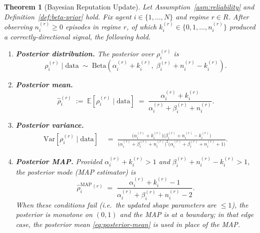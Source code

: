 \documentclass[12pt,openany]{book}
\newcommand{\E}{\mathbb{E}}
\numberwithin{equation}{chapter}
\theoremstyle{plain}
\newtheorem{theorem}{Theorem}[chapter]
\theoremstyle{definition}
\theoremstyle{remark}
\numberwithin{equation}{chapter}
\theoremstyle{plain}
\newcommand{\calR}{\mathcal{R}}
\def\calR{R}%
\begin{document}
\begin{theorem}[Bayesian Reputation Update]
\label{thm:reputation-update}
Let Assumption~\ref{asm:reliability} and
Definition~\ref{def:beta-prior} hold.  Fix agent
$i \in \{1,\ldots,N\}$ and regime $r \in \calR$.
After observing $n_i^{(r)} \geq 0$ episodes in regime $r$,
of which $k_i^{(r)} \in \{0, 1, \ldots, n_i^{(r)}\}$
produced a correctly-directional signal, the following hold.

\begin{enumerate}
  \item[\textup{(i)}] \textbf{Posterior distribution.}
        The posterior over $\rho_i^{(r)}$ is
        \begin{equation}
          \rho_i^{(r)} \mid \mathrm{data}
          \;\sim\;
          \mathrm{Beta}\!\left(
            \alpha_i^{(r)} + k_i^{(r)},\;
            \beta_i^{(r)} + n_i^{(r)} - k_i^{(r)}
          \right).
          \label{eq:beta-posterior}
        \end{equation}

  \item[\textup{(ii)}] \textbf{Posterior mean.}
        \begin{equation}
          \hat{\rho}_i^{(r)}
          \;:=\;
          \E\!\left[\rho_i^{(r)} \mid \mathrm{data}\right]
          \;=\;
          \frac{\alpha_i^{(r)} + k_i^{(r)}}
               {\alpha_i^{(r)} + \beta_i^{(r)} + n_i^{(r)}}.
          \label{eq:posterior-mean}
        \end{equation}

  \item[\textup{(iii)}] \textbf{Posterior variance.}
        \begin{align}
          \mathrm{Var}\!\left[\rho_i^{(r)} \mid \mathrm{data}\right]
          &\;=\;
          \frac{
            \bigl(\alpha_i^{(r)} + k_i^{(r)}\bigr)
            \bigl(\beta_i^{(r)} + n_i^{(r)} - k_i^{(r)}\bigr)
          }{
            \bigl(\alpha_i^{(r)} + \beta_i^{(r)} + n_i^{(r)}\bigr)^2
            \bigl(\alpha_i^{(r)} + \beta_i^{(r)} + n_i^{(r)} + 1\bigr)
          }.
          \label{eq:posterior-variance}
        \end{align}

  \item[\textup{(iv)}] \textbf{Posterior MAP.}
        Provided $\alpha_i^{(r)} + k_i^{(r)} > 1$ and
        $\beta_i^{(r)} + n_i^{(r)} - k_i^{(r)} > 1$, the
        posterior mode (MAP estimator) is
        \begin{equation}
          \hat{\rho}^{\mathrm{MAP}}_{i}{}^{(r)}
          \;=\;
          \frac{\alpha_i^{(r)} + k_i^{(r)} - 1}
               {\alpha_i^{(r)} + \beta_i^{(r)} + n_i^{(r)} - 2}.
          \label{eq:posterior-map}
        \end{equation}
        When these conditions fail (i.e.\ the updated shape
        parameters are $\leq 1$), the posterior is
        monotone on $(0,1)$ and the MAP is at a boundary;
        in that edge case, the posterior mean
        \eqref{eq:posterior-mean} is used in place of the MAP.
\end{enumerate}
\end{theorem}
\end{document}
